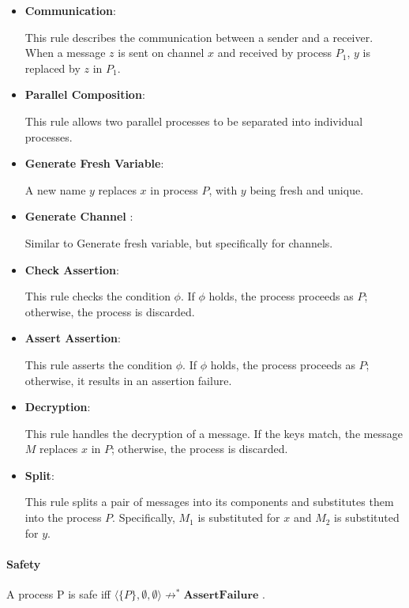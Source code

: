 \documentclass[master,english]{kuisthesis}
\theoremstyle{definition}
\begin{document}
\begin{itemize}
    \item \textbf{Communication}:

    This rule describes the communication between a sender and a receiver. When a message \(z\) is sent on channel \(x\) and received by process \(P_1\), \(y\) is replaced by \(z\) in \(P_1\).

    \item \textbf{Parallel Composition}:

    This rule allows two parallel processes to be separated into individual processes.

    \item \textbf{Generate Fresh Variable}:

    A new name \(y\) replaces \(x\) in process \(P\), with \(y\) being fresh and unique.

    \item \textbf{Generate Channel }:

    Similar to Generate fresh variable, but specifically for channels.

    \item \textbf{Check Assertion}:

    This rule checks the condition \(\phi\). If \(\phi\) holds, the process proceeds as \(P\); otherwise, the process is discarded.

    \item \textbf{Assert Assertion}:

    This rule asserts the condition \(\phi\). If \(\phi\) holds, the process proceeds as \(P\); otherwise, it results in an assertion failure.

    \item \textbf{Decryption}:

    This rule handles the decryption of a message. If the keys match, the message \(M\) replaces \(x\) in \(P\); otherwise, the process is discarded.
    
    \item \textbf{Split}:

This rule splits a pair of messages into its components and substitutes them into the process \(P\). Specifically, \(M_1\) is substituted for \(x\) and \(M_2\) is substituted for \(y\).

\end{itemize}

\paragraph{Safety} A process P is safe iff $\langle\{P\}, \emptyset, \emptyset\rangle \not\longrightarrow^* \textbf{AssertFailure} $ .
\end{document}
